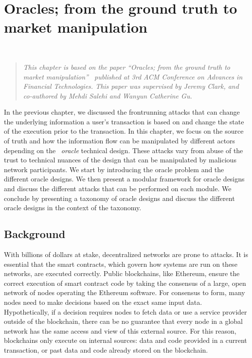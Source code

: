 \chapter{Oracles; from the ground truth to market manipulation} ~\label{sec:oracles}

\begin{quote}
	\textit{This chapter is based on the paper ``Oracles; from the ground truth to market manipulation''~\cite{eskandari2021sok} published at 3rd ACM Conference on Advances in Financial Technologies. This paper was supervised by Jeremy Clark, and co-authored by Mehdi Salehi and Wanyun Catherine Gu.}
\end{quote}

In the previous chapter, we discussed the frontrunning attacks that can change the underlying information a user's transaction is based on and change the state of the execution prior to the transaction. In this chapter, we focus on the source of truth and how the information flow can be manipulated by different actors depending on the ~\textit{oracle} technical design. These attacks vary from abuse of the trust to technical nuances of the design that can be manipulated by malicious network participants. We start by introducing the oracle problem and the different oracle designs. We then present a modular framework for oracle designs and discuss the different attacks that can be performed on each module. We conclude by presenting a taxonomy of oracle designs and discuss the different oracle designs in the context of the taxonomy. 


\section{Background}


With billions of dollars at stake, decentralized networks are prone to attacks. It is essential that the smart contracts, which govern how systems are run on these networks, are executed correctly. Public blockchains, like Ethereum, ensure the correct execution of smart contract code by taking the consensus of a large, open network of nodes operating the Ethereum software. For consensus to form, many nodes need to make decisions based on the exact same input data. Hypothetically, if a decision requires nodes to fetch data or use a service provider outside of the blockchain, there can be no guarantee that every node in a global network has the same access and view of this external source. For this reason, blockchains only execute on internal sources: data and code provided in a current transaction, or past data and code already stored on the blockchain.

